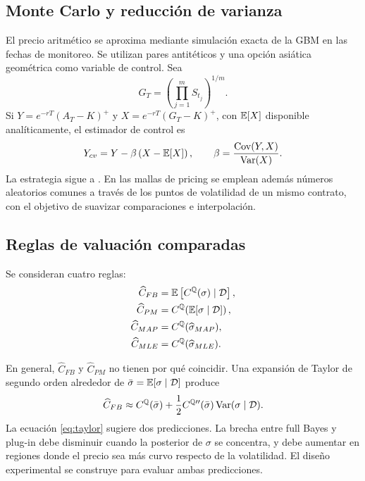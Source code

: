 \subsection{Monte Carlo y reducción de varianza}

El precio aritmético se aproxima mediante simulación exacta de la GBM en las fechas de monitoreo. Se utilizan pares antitéticos y una opción asiática geométrica como variable de control. Sea
\begin{equation}
 G_T=\left(\prod_{j=1}^{m}S_{t_j}\right)^{1/m}.
\end{equation}
Si $Y=e^{-rT}(A_T-K)^+$ y $X=e^{-rT}(G_T-K)^+$, con $\mathbb{E}[X]$ disponible analíticamente, el estimador de control es
\begin{equation}
 Y_{cv}=Y-\beta\left(X-\mathbb{E}[X]\right),
 \qquad
 \beta=\frac{\operatorname{Cov}(Y,X)}{\operatorname{Var}(X)}.
 \label{eq:cv}
\end{equation}
La estrategia sigue a \citet{kemnavorst1990}. En las mallas de pricing se emplean además números aleatorios comunes a través de los puntos de volatilidad de un mismo contrato, con el objetivo de suavizar comparaciones e interpolación.

\subsection{Reglas de valuación comparadas}

Se consideran cuatro reglas:
\begin{align}
 \widehat C_{FB}
 &=\mathbb{E}\left[C^{\mathbb{Q}}(\sigma)\mid\mathcal D\right],
 \label{eq:fb}\\
 \widehat C_{PM}
 &=C^{\mathbb{Q}}\!\left(\mathbb{E}[\sigma\mid\mathcal D]\right),
 \label{eq:pm}\\
 \widehat C_{MAP}
 &=C^{\mathbb{Q}}(\widehat\sigma_{MAP}),
 \label{eq:map}\\
 \widehat C_{MLE}
 &=C^{\mathbb{Q}}(\widehat\sigma_{MLE}).
 \label{eq:mle}
\end{align}

En general, $\widehat C_{FB}$ y $\widehat C_{PM}$ no tienen por qué coincidir. Una expansión de Taylor de segundo orden alrededor de $\bar\sigma=\mathbb{E}[\sigma\mid\mathcal D]$ produce
\begin{equation}
 \widehat C_{FB}
 \approx
 C^{\mathbb{Q}}(\bar\sigma)
 +\frac{1}{2}C^{\mathbb{Q}\prime\prime}(\bar\sigma)
 \operatorname{Var}(\sigma\mid\mathcal D).
 \label{eq:taylor}
\end{equation}
La ecuación \eqref{eq:taylor} sugiere dos predicciones. La brecha entre full Bayes y plug-in debe disminuir cuando la posterior de $\sigma$ se concentra, y debe aumentar en regiones donde el precio sea más curvo respecto de la volatilidad. El diseño experimental se construye para evaluar ambas predicciones.
